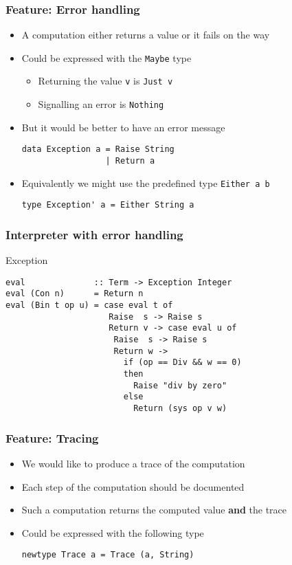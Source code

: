 \documentclass{beamer}
\begin{document}
\begin{frame}[fragile]
  \frametitle{Feature: Error handling}
  \begin{itemize}
  \item A computation either returns a value or it fails on the way
  \item Could be expressed with the \lstinline{Maybe} type
    \begin{itemize}
    \item Returning the value \lstinline{v} is \lstinline{Just v}
    \item Signalling an error is \lstinline{Nothing}
    \end{itemize}
  \item But it would be better to have an error message
\begin{lstlisting}
data Exception a = Raise String
                 | Return a
\end{lstlisting}
  \item Equivalently we might use the  predefined type \lstinline{Either a b}
\begin{lstlisting}
type Exception' a = Either String a
\end{lstlisting}
  \end{itemize}
\end{frame}

\begin{frame}[fragile]
  \frametitle{Interpreter with error handling}
  \begin{block}{Exception}
\begin{lstlisting}
eval              :: Term -> Exception Integer
eval (Con n)      = Return n
eval (Bin t op u) = case eval t of
                     Raise  s -> Raise s
                     Return v -> case eval u of
                      Raise  s -> Raise s
                      Return w ->
                        if (op == Div && w == 0)
                        then  
                          Raise "div by zero"
                        else                                  
                          Return (sys op v w)
\end{lstlisting}
\end{block}     
\end{frame}

\begin{frame}[fragile]
  \frametitle{Feature: Tracing}
  \begin{itemize}
  \item We would like to produce a trace of the computation
  \item Each step of the computation should be documented
  \item Such a computation returns the computed value \textbf{and} the
    trace
  \item Could be expressed with the following type
\begin{lstlisting}
newtype Trace a = Trace (a, String)
\end{lstlisting}
  \end{itemize}
\end{frame}
\end{document}
